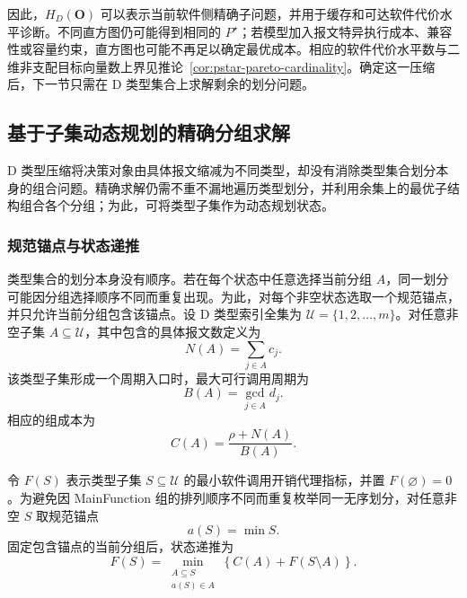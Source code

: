 \documentclass[UTF8,a4paper,twoside,zihao=-4]{ctexart}
\numberwithin{equation}{section}
\numberwithin{figure}{section}
\numberwithin{table}{section}
\theoremstyle{definition}
\numberwithin{algocf}{section}
\begin{document}
因此，$H_D(\boldsymbol O)$ 可以表示当前软件侧精确子问题，并用于缓存和可达软件代价水平诊断。不同直方图仍可能得到相同的 $P^\star$；若模型加入报文特异执行成本、兼容性或容量约束，直方图也可能不再足以确定最优成本。相应的软件代价水平数与二维非支配目标向量数上界见推论~\ref{cor:pstar-pareto-cardinality}。确定这一压缩后，下一节只需在 D 类型集合上求解剩余的划分问题。

\subsection{基于子集动态规划的精确分组求解}
\label{subsec:deterministic-subset-dp}

D 类型压缩将决策对象由具体报文缩减为不同类型，却没有消除类型集合划分本身的组合问题。精确求解仍需不重不漏地遍历类型划分，并利用余集上的最优子结构组合各个分组；为此，可将类型子集作为动态规划状态。

\subsubsection{规范锚点与状态递推}
\label{subsubsec:anchor-recurrence}

类型集合的划分本身没有顺序。若在每个状态中任意选择当前分组 $A$，同一划分可能因分组选择顺序不同而重复出现。为此，对每个非空状态选取一个规范锚点，并只允许当前分组包含该锚点。设 D 类型索引全集为 $\mathcal U=\{1,2,\ldots,m\}$。对任意非空子集 $A\subseteq\mathcal U$，其中包含的具体报文数定义为
\begin{equation}
 N(A)
 =
 \sum_{j\in A}c_j.
\label{eq:subset-message-count}
\end{equation}
该类型子集形成一个周期入口时，最大可行调用周期为
\begin{equation}
 B(A)
 =
 \gcd_{j\in A}d_j.
\label{eq:subset-timebase}
\end{equation}
相应的组成本为
\begin{equation}
 C(A)
 =
 \frac{\rho+N(A)}{B(A)}.
\label{eq:subset-group-cost}
\end{equation}

令 $F(S)$ 表示类型子集 $S\subseteq\mathcal U$ 的最小软件调用开销代理指标，并置 $F(\varnothing)=0$。为避免因 MainFunction 组的排列顺序不同而重复枚举同一无序划分，对任意非空 $S$ 取规范锚点
\begin{equation}
 a(S)
 =
 \min S.
\label{eq:subset-anchor}
\end{equation}
固定包含锚点的当前分组后，状态递推为
\begin{equation}
 F(S)
 =
 \min_{\substack{A\subseteq S\\a(S)\in A}}
 \left\{
 C(A)+F(S\setminus A)
 \right\}.
\label{eq:anchor-subset-dp}
\end{equation}
\end{document}
